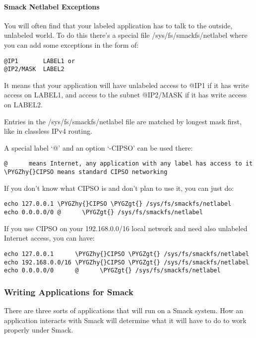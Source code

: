 \documentclass[a4paper,8pt,english]{sphinxmanual}
\def\PYGZgt{\char`\>}
\def\PYGZhy{\char`\-}
\begin{document}
\paragraph{Smack Netlabel Exceptions}
\label{admin-guide/LSM/Smack:smack-netlabel-exceptions}
You will often find that your labeled application has to talk to the outside,
unlabeled world. To do this there's a special file /sys/fs/smackfs/netlabel
where you can add some exceptions in the form of:

\begin{Verbatim}[commandchars=\\\{\}]
@IP1       LABEL1 or
@IP2/MASK  LABEL2
\end{Verbatim}

It means that your application will have unlabeled access to @IP1 if it has
write access on LABEL1, and access to the subnet @IP2/MASK if it has write
access on LABEL2.

Entries in the /sys/fs/smackfs/netlabel file are matched by longest mask
first, like in classless IPv4 routing.

A special label `@' and an option `-CIPSO' can be used there:

\begin{Verbatim}[commandchars=\\\{\}]
@      means Internet, any application with any label has access to it
\PYGZhy{}CIPSO means standard CIPSO networking
\end{Verbatim}

If you don't know what CIPSO is and don't plan to use it, you can just do:

\begin{Verbatim}[commandchars=\\\{\}]
echo 127.0.0.1 \PYGZhy{}CIPSO \PYGZgt{} /sys/fs/smackfs/netlabel
echo 0.0.0.0/0 @      \PYGZgt{} /sys/fs/smackfs/netlabel
\end{Verbatim}

If you use CIPSO on your 192.168.0.0/16 local network and need also unlabeled
Internet access, you can have:

\begin{Verbatim}[commandchars=\\\{\}]
echo 127.0.0.1      \PYGZhy{}CIPSO \PYGZgt{} /sys/fs/smackfs/netlabel
echo 192.168.0.0/16 \PYGZhy{}CIPSO \PYGZgt{} /sys/fs/smackfs/netlabel
echo 0.0.0.0/0      @      \PYGZgt{} /sys/fs/smackfs/netlabel
\end{Verbatim}


\subsubsection{Writing Applications for Smack}
\label{admin-guide/LSM/Smack:writing-applications-for-smack}
There are three sorts of applications that will run on a Smack system. How an
application interacts with Smack will determine what it will have to do to
work properly under Smack.
\end{document}
